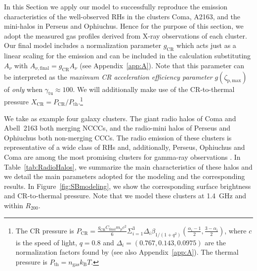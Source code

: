 \documentclass[traditabstract]{aa}
\newcommand{\rmn}{\mathrm}
\begin{document}
In this Section we apply our model to successfully reproduce the emission
characteristics of the well-observed RHs in the clusters Coma, A2163, and the
mini-halos in Perseus and Ophiuchus. Hence for the purpose of this section, we
adopt the measured gas profiles derived from X-ray observations of each cluster.
Our final model includes a normalization parameter $g_{\rmn{CR}}$ which acts
just as a linear scaling for the emission and can be included in the calculation
substituting $A_{\nu}$ with $A_{\nu,\rmn{final}}=g_{\rmn{CR}}A_{\nu}$ (see
Appendix~\ref{app:A}). Note that this parameter can be interpreted as the
\emph{maximum CR acceleration efficiency parameter} $g(\zeta_{\rmn{p,max}})$ of
\cite{2010MNRAS.409..449P} \emph{only} when $\gamma_{\rmn{tu}}\approx100$. We
will additionally make use of the CR-to-thermal pressure
$X_{\rmn{CR}}=P_{\rmn{CR}}/P_{\rmn{th}}$.\footnote[11]{The CR pressure is
  $P_{\rmn{CR}}=\frac{g_{\rmn{CR}} C_{\rmn{final}} m_{\rmn{p}} c^{2}}{6}
  \Sigma_{i=1}^{3} \Delta_{i} \beta_{1/(1+q^2)} \left(
    \frac{\alpha_{i}-1}{2},\frac{3-\alpha_{i}}{2} \right)$, where $c$ is the
  speed of light, $q=0.8$ \citep{2010MNRAS.409..449P} and $\Delta_{i} = (0.767,
  0.143, 0.0975)$ are the normalization factors found by
  \cite{2010MNRAS.409..449P} (see also Appendix~\ref{app:A}). The thermal
  pressure is $P_{\rmn{th}}=n_{\rmn{gas}}k_{\rmn{B}}T$.}

We take as example four galaxy clusters. The giant radio halos of Coma \citep{1997A&A...321...55D} and Abell~2163 \citep{2001A&A...373..106F,2009A&A...499..679M} both merging NCCCs, and the radio-mini halos of Perseus \citep{1990MNRAS.246..477P} and Ophiuchus \citep{2009A&A...499..371G,2009A&A...499..679M} both non-merging CCCs. The radio emission of these clusters is representative of a wide class of RHs and, additionally, Perseus, Ophiuchus and Coma are among the most promising clusters for gamma-ray observations \citep{2010MNRAS.409..449P,2011arXiv1105.3240P}. In Table~\ref{tab:RadioHalos}, we summarize the main characteristics of these halos and we detail the main parameters adopted for the modeling and the corresponding results. In Figure~\ref{fig:SBmodeling}, we show the corresponding surface brightness and CR-to-thermal pressure. Note that we model these clusters at 1.4~GHz and within $R_{200}$.  
\end{document}
